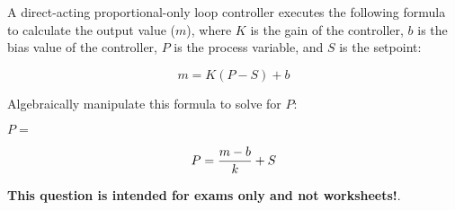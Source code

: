 

A direct-acting proportional-only loop controller executes the following formula to calculate the output value ($m$), where $K$ is the gain of the controller, $b$ is the bias value of the controller, $P$ is the process variable, and $S$ is the setpoint:

$$m = K(P - S) + b$$

Algebraically manipulate this formula to solve for $P$:

\vskip 20pt

$P = $







$$P = {m - b \over k} + S$$







{\bf This question is intended for exams only and not worksheets!}.



